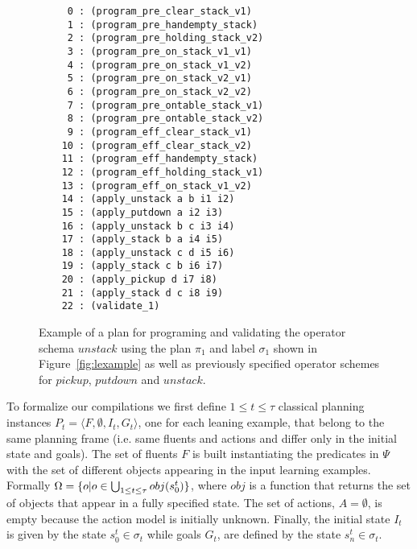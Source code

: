 \documentclass[letterpaper]{article} %
\newcommand{\tup}[1]{{\langle #1 \rangle}}
\begin{document}
\begin{figure}[hbt]
\begin{small}
\begin{verbatim}
     0 : (program_pre_clear_stack_v1)
     1 : (program_pre_handempty_stack)
     2 : (program_pre_holding_stack_v2)
     3 : (program_pre_on_stack_v1_v1)
     4 : (program_pre_on_stack_v1_v2)
     5 : (program_pre_on_stack_v2_v1)
     6 : (program_pre_on_stack_v2_v2)
     7 : (program_pre_ontable_stack_v1)
     8 : (program_pre_ontable_stack_v2)
     9 : (program_eff_clear_stack_v1)
    10 : (program_eff_clear_stack_v2)
    11 : (program_eff_handempty_stack)
    12 : (program_eff_holding_stack_v1)
    13 : (program_eff_on_stack_v1_v2)
    14 : (apply_unstack a b i1 i2)
    15 : (apply_putdown a i2 i3)
    16 : (apply_unstack b c i3 i4)
    17 : (apply_stack b a i4 i5)
    18 : (apply_unstack c d i5 i6)
    19 : (apply_stack c b i6 i7)
    20 : (apply_pickup d i7 i8)
    21 : (apply_stack d c i8 i9)
    22 : (validate_1)
\end{verbatim}
\end{small}
 \caption{\small Example of a plan for programing and validating the operator schema $unstack$ using the plan $\pi_1$ and label $\sigma_1$ shown in Figure~\ref{fig:lexample} as well as previously specified operator schemes for $pickup$, $putdown$ and $unstack$.}
\label{fig:plan}
\end{figure}

To formalize our compilations we first define {\small $1\leq t\leq \tau$} classical planning instances $P_t=\tup{F,\emptyset,I_t,G_t}$, one for each leaning example, that belong to the same planning frame (i.e. same fluents and actions and differ only in the initial state and goals). The set of fluents $F$ is built instantiating the predicates in $\Psi$ with the set of different objects appearing in the input learning examples. Formally $\Omega=\{o|o\in \bigcup_{\small 1\leq t\leq \tau} obj(s_0^t)\}$, where $obj$ is a function that returns the set of objects that appear in a fully specified state. The set of actions, $A=\emptyset$, is empty because the action model is initially unknown. Finally, the initial state $I_t$ is given by the state $s_0^t\in \sigma_t$ while goals $G_t$, are defined by the state $s_n^t\in \sigma_t$. 
\end{document}
